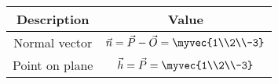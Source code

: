 \begin{tabular}{|c|c|}
\hline
\textbf{Description} & \textbf{Value} \\
\hline
Normal vector & $\vec{n} = \vec{P} - \vec{O} = \myvec{1\\2\\-3}$ \\ \hline
Point on plane & $\vec{h} = \vec{P} = \myvec{1\\2\\-3}$ \\ \hline
\end{tabular}
